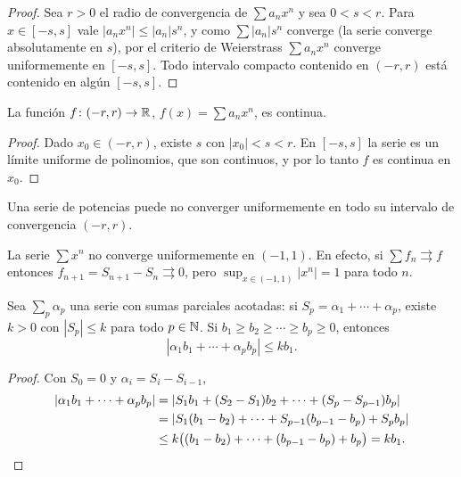 \begin{proof}
  Sea \(r > 0\) el radio de convergencia de \(\sum a_n x^n\) y sea \(0 < s < r\). Para \(x \in [-s, s]\) vale \(|a_n x^n| \leq |a_n| s^n\), y como \(\sum |a_n| s^n\) converge (la serie converge absolutamente en \(s\)), por el criterio de Weierstrass \(\sum a_n x^n\) converge uniformemente en \([-s, s]\). Todo intervalo compacto contenido en \((-r, r)\) está contenido en algún \([-s, s]\).
\end{proof}

\begin{corollary}
  La función \(f\colon (-r, r) \to \mathbb{R}\), \(f(x) = \sum a_n x^n\), es continua.
\end{corollary}

\begin{proof}
  Dado \(x_0 \in (-r, r)\), existe \(s\) con \(|x_0| < s < r\). En \([-s, s]\) la serie es un límite uniforme de polinomios, que son continuos, y por lo tanto \(f\) es continua en \(x_0\).
\end{proof}

Una serie de potencias puede no converger uniformemente en todo su intervalo de convergencia \((-r, r)\).

\begin{eg}
  La serie \(\sum x^n\) no converge uniformemente en \((-1, 1)\). En efecto, si \(\sum f_n \rightrightarrows f\) entonces \(f_{n+1} = S_{n+1} - S_n \rightrightarrows 0\), pero \(\sup_{x \in (-1, 1)} |x^n| = 1\) para todo \(n\).
\end{eg}

\begin{lemma}
  Sea \(\sum_p \alpha_p\) una serie con sumas parciales acotadas: si \(S_p = \alpha_1 + \cdots + \alpha_p\), existe \(k > 0\) con \(|S_p| \leq k\) para todo \(p \in \mathbb{N}\). Si \(b_1 \geq b_2 \geq \cdots \geq b_p \geq 0\), entonces
  \[
    |\alpha_1 b_1 + \cdots + \alpha_p b_p| \leq k b_1.
  \]
\end{lemma}

\begin{proof}
  Con \(S_0 = 0\) y \(\alpha_i = S_i - S_{i-1}\),
  \begin{align*}
    |\alpha_1 b_1 + \cdots + \alpha_p b_p| & = |S_1 b_1 + (S_2 - S_1) b_2 + \cdots + (S_p - S_{p-1}) b_p|              \\
                                           & = |S_1 (b_1 - b_2) + \cdots + S_{p-1} (b_{p-1} - b_p) + S_p b_p|          \\
                                           & \leq k \bigl( (b_1 - b_2) + \cdots + (b_{p-1} - b_p) + b_p \bigr) = k b_1. \qedhere
  \end{align*}
\end{proof}

